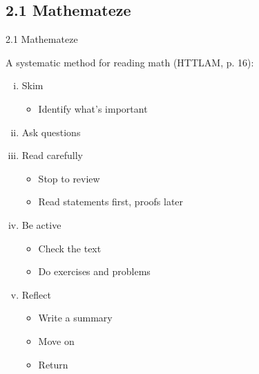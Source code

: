 \documentclass[../slides.tex]{subfiles}
\begin{document}
\subsection{2.1 Mathemateze}
\begin{frame}{2.1 Mathemateze}
		
	

A systematic method for reading math (HTTLAM, p. 16):
		
			\begin{enumerate}[(i)]
			
				\item Skim 
				
				\begin{itemize}
				
					\item Identify what's important
				
				\end{itemize}
				
				\item Ask questions
			
				\item Read carefully
				
					\begin{itemize}
					
						\item Stop to review
						
						\item Read statements first, proofs later
											
					\end{itemize}
				
				\item Be active
				
					\begin{itemize}
						
						\item Check the text 

						\item Do exercises and problems
					
					\end{itemize}
				
				\item Reflect
				
					\begin{itemize}
						
						\item Write a summary
						
						\item Move on
						
						\item Return
					
					\end{itemize}
			
			\end{enumerate}
	
		
\end{frame}
\end{document}

